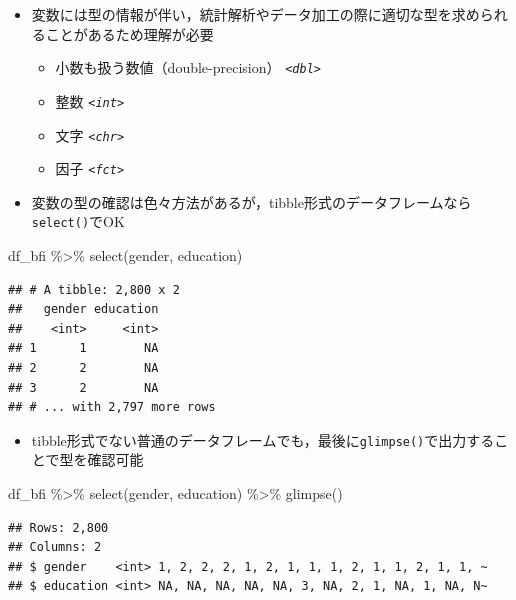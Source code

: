 \documentclass[
  xelatex,ja=standard, b5paper]{bxjsbook}
\newenvironment{Shaded}{\begin{snugshade}}{\end{snugshade}}
\newcommand{\FunctionTok}[1]{\textcolor[rgb]{0.00,0.00,0.00}{#1}}
\newcommand{\NormalTok}[1]{#1}
\newcommand{\SpecialCharTok}[1]{\textcolor[rgb]{0.00,0.00,0.00}{#1}}
\providecommand{\tightlist}{%
  \setlength{\itemsep}{0pt}\setlength{\parskip}{0pt}}
\begin{document}
\begin{itemize}
\tightlist
\item
  変数には型の情報が伴い，統計解析やデータ加工の際に適切な型を求められることがあるため理解が必要

  \begin{itemize}
  \tightlist
  \item
    小数も扱う数値（double-precision） \emph{\texttt{\textless{}dbl\textgreater{}}}
  \item
    整数 \emph{\texttt{\textless{}int\textgreater{}}}
  \item
    文字 \emph{\texttt{\textless{}chr\textgreater{}}}
  \item
    因子 \emph{\texttt{\textless{}fct\textgreater{}}}
  \end{itemize}
\item
  変数の型の確認は色々方法があるが，tibble形式のデータフレームなら\texttt{select()}でOK
\end{itemize}

\begin{Shaded}
\begin{Highlighting}[]
\NormalTok{df\_bfi }\SpecialCharTok{\%\textgreater{}\%} 
  \FunctionTok{select}\NormalTok{(gender, education)}
\end{Highlighting}
\end{Shaded}

\begin{verbatim}
## # A tibble: 2,800 x 2
##   gender education
##    <int>     <int>
## 1      1        NA
## 2      2        NA
## 3      2        NA
## # ... with 2,797 more rows
\end{verbatim}

\begin{itemize}
\tightlist
\item
  tibble形式でない普通のデータフレームでも，最後に\texttt{glimpse()}で出力することで型を確認可能
\end{itemize}

\begin{Shaded}
\begin{Highlighting}[]
\NormalTok{df\_bfi }\SpecialCharTok{\%\textgreater{}\%}
  \FunctionTok{select}\NormalTok{(gender, education) }\SpecialCharTok{\%\textgreater{}\%}
  \FunctionTok{glimpse}\NormalTok{()}
\end{Highlighting}
\end{Shaded}

\begin{verbatim}
## Rows: 2,800
## Columns: 2
## $ gender    <int> 1, 2, 2, 2, 1, 2, 1, 1, 1, 2, 1, 1, 2, 1, 1, ~
## $ education <int> NA, NA, NA, NA, NA, 3, NA, 2, 1, NA, 1, NA, N~
\end{verbatim}
\end{document}
